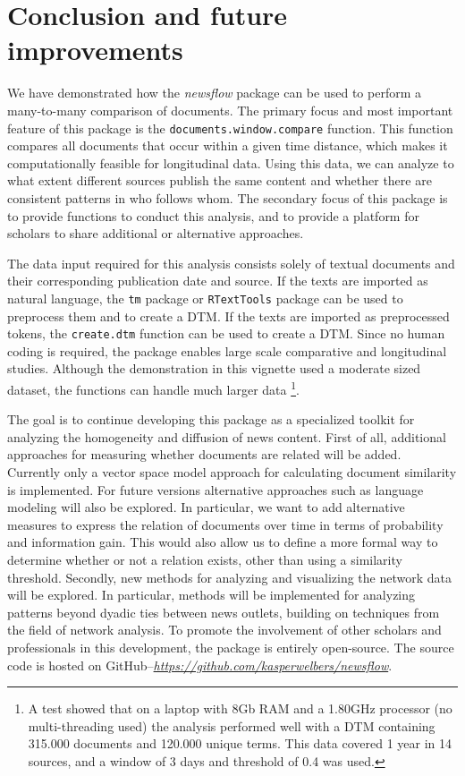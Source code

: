 \section{Conclusion and future
improvements}\label{conclusion-and-future-improvements}

We have demonstrated how the \emph{newsflow} package can be used to
perform a many-to-many comparison of documents. The primary focus and
most important feature of this package is the
\texttt{documents.window.compare} function. This function compares all
documents that occur within a given time distance, which makes it
computationally feasible for longitudinal data. Using this data, we can
analyze to what extent different sources publish the same content and
whether there are consistent patterns in who follows whom. The secondary
focus of this package is to provide functions to conduct this analysis,
and to provide a platform for scholars to share additional or
alternative approaches.

The data input required for this analysis consists solely of textual
documents and their corresponding publication date and source. If the
texts are imported as natural language, the \texttt{tm} package or
\texttt{RTextTools} package can be used to preprocess them and to create
a DTM. If the texts are imported as preprocessed tokens, the
\texttt{create.dtm} function can be used to create a DTM. Since no human
coding is required, the package enables large scale comparative and
longitudinal studies. Although the demonstration in this vignette used a
moderate sized dataset, the functions can handle much larger data
\footnote{A test showed that on a laptop with 8Gb RAM and a 1.80GHz
  processor (no multi-threading used) the analysis performed well with a
  DTM containing 315.000 documents and 120.000 unique terms. This data
  covered 1 year in 14 sources, and a window of 3 days and threshold of
  0.4 was used.}.

The goal is to continue developing this package as a specialized toolkit
for analyzing the homogeneity and diffusion of news content. First of
all, additional approaches for measuring whether documents are related
will be added. Currently only a vector space model approach for
calculating document similarity is implemented. For future versions
alternative approaches such as language modeling will also be explored.
In particular, we want to add alternative measures to express the
relation of documents over time in terms of probability and information
gain. This would also allow us to define a more formal way to determine
whether or not a relation exists, other than using a similarity
threshold. Secondly, new methods for analyzing and visualizing the
network data will be explored. In particular, methods will be
implemented for analyzing patterns beyond dyadic ties between news
outlets, building on techniques from the field of network analysis. To
promote the involvement of other scholars and professionals in this
development, the package is entirely open-source. The source code is
hosted on
GitHub--\emph{\url{https://github.com/kasperwelbers/newsflow}}.

